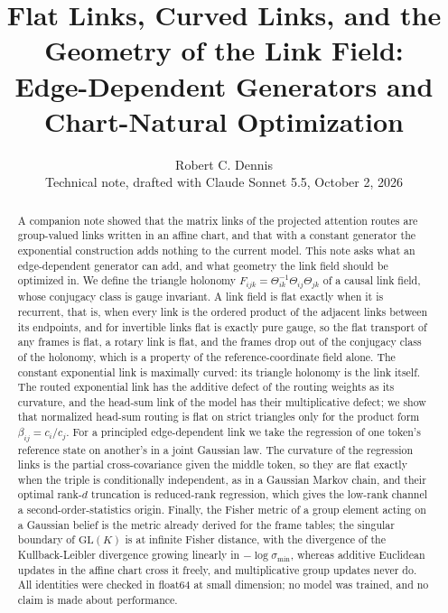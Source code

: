 \documentclass[11pt]{article}
\title{Flat Links, Curved Links, and the Geometry of the Link Field:\\Edge-Dependent Generators and Chart-Natural Optimization}
\author{Robert C. Dennis\\\small Technical note, drafted with Claude Sonnet 5.5, October 2, 2026}
\date{}
\theoremstyle{definition}
\theoremstyle{remark}
\newcommand{\GL}{\mathrm{GL}}
\begin{document}
\maketitle

\begin{abstract}
A companion note showed that the matrix links of the projected attention routes are group-valued links written in an affine chart, and that with a constant generator the exponential construction adds nothing to the current model. This note asks what an edge-dependent generator can add, and what geometry the link field should be optimized in. We define the triangle holonomy $F_{ijk}=\Theta_{ik}^{-1}\Theta_{ij}\Theta_{jk}$ of a causal link field, whose conjugacy class is gauge invariant. A link field is flat exactly when it is recurrent, that is, when every link is the ordered product of the adjacent links between its endpoints, and for invertible links flat is exactly pure gauge, so the flat transport of any frames is flat, a rotary link is flat, and the frames drop out of the conjugacy class of the holonomy, which is a property of the reference-coordinate field alone. The constant exponential link is maximally curved: its triangle holonomy is the link itself. The routed exponential link has the additive defect of the routing weights as its curvature, and the head-sum link of the model has their multiplicative defect; we show that normalized head-sum routing is flat on strict triangles only for the product form $\beta_{ij}=c_i/c_j$. For a principled edge-dependent link we take the regression of one token's reference state on another's in a joint Gaussian law. The curvature of the regression links is the partial cross-covariance given the middle token, so they are flat exactly when the triple is conditionally independent, as in a Gaussian Markov chain, and their optimal rank-$d$ truncation is reduced-rank regression, which gives the low-rank channel a second-order-statistics origin. Finally, the Fisher metric of a group element acting on a Gaussian belief is the metric already derived for the frame tables; the singular boundary of $\GL(K)$ is at infinite Fisher distance, with the divergence of the Kullback-Leibler divergence growing linearly in $-\log\sigma_{\min}$, whereas additive Euclidean updates in the affine chart cross it freely, and multiplicative group updates never do. All identities were checked in float64 at small dimension; no model was trained, and no claim is made about performance.
\end{abstract}
\end{document}
